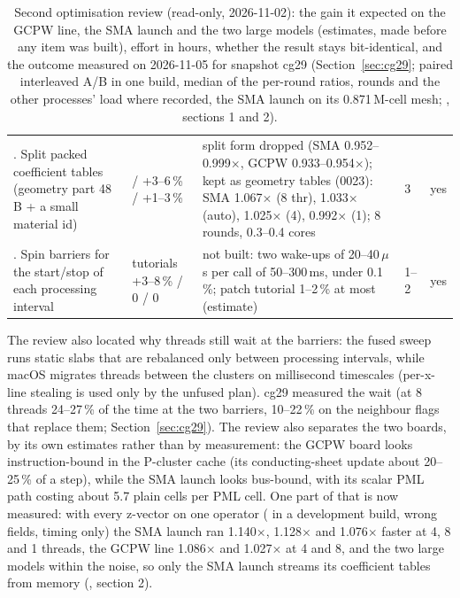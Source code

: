 \begin{table}[htbp]
\begin{tabular}{@{}>{\raggedright\arraybackslash}p{}>{\raggedright\arraybackslash}p{}>{\raggedright\arraybackslash}p{}lc@{}}
9. Split packed coefficient tables (geometry part 48\,B + a small material id) & 0 / +3--6\,\% / +1--3\,\% & split form dropped (SMA 0.952--0.999$\times$, GCPW 0.933--0.954$\times$); kept as geometry tables (0023): SMA 1.067$\times$ (8 thr), 1.033$\times$ (auto), 1.025$\times$ (4), 0.992$\times$ (1); 8 rounds, 0.3--0.4 cores & 3 & yes \\
10. Spin barriers for the start/stop of each processing interval & tutorials +3--8\,\% / 0 / 0 & not built: two wake-ups of 20--40\,$\mu$s per call of 50--300\,ms, under 0.1\,\%; patch tutorial 1--2\,\% at most (estimate) & 1--2 & yes \\
\bottomrule
\end{tabular}
\caption{Second optimisation review (read-only, 2026-11-02): the gain it expected on the GCPW line, the SMA launch and
the two large models (estimates, made before any item was built), effort in hours, whether the result stays
bit-identical, and the outcome measured on 2026-11-05 for snapshot cg29 (Section~\ref{sec:cg29}; paired interleaved
A/B in one build, median of the per-round ratios, rounds and the other processes' load where recorded, the SMA launch
on its 0.871\,M-cell mesh; , sections 1 and 2).}\label{tab:review2}
\end{table}

The review also located why threads still wait at the barriers: the fused sweep runs static slabs that are rebalanced
only between processing intervals, while macOS migrates threads between the clusters on millisecond timescales
(per-x-line stealing is used only by the unfused plan). cg29 measured the wait (at 8 threads 24--27\,\% of the time at
the two barriers, 10--22\,\% on the neighbour flags that replace them; Section~\ref{sec:cg29}). The review also
separates the two boards, by its own estimates rather than by measurement: the GCPW board looks instruction-bound in
the P-cluster cache (its conducting-sheet update about 20--25\,\% of a step), while the SMA launch looks bus-bound,
with its scalar PML path costing about 5.7 plain cells per PML cell. One part of that is now measured: with every
z-vector on one operator ( in a development build, wrong fields, timing only) the SMA
launch ran 1.140$\times$, 1.128$\times$ and 1.076$\times$ faster at 4, 8 and 1 threads, the GCPW line 1.086$\times$
and 1.027$\times$ at 4 and 8, and the two large models within the noise, so only the SMA launch streams its
coefficient tables from memory (, section 2).

